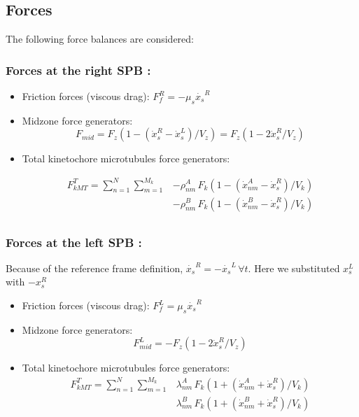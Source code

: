 \documentclass[a4paper,12pt]{article}
\begin{document}
\subsection{Forces}

The following force balances are considered:


\subsubsection{Forces at the right SPB :}


\begin{itemize}
\item Friction forces (viscous drag):  $F_f^R = -\mu_s \dot{x_s}^R$
\item Midzone force generators: 
  $$F_{mid} = F_z\left(1 - (\dot{x}^R_s - \dot{x}_s^L)/V_z\right) =
  F_z\left(1 - 2\dot{x}^R_s / V_z\right) $$
\item Total kinetochore microtubules force generators:

 $$ \begin{aligned}
    F_{kMT}^T = \sum_{n = 1}^{N}\sum_{m = 1}^{M_k} & - \rho_{nm}^A\,F_k\left( 1 -
      (\dot{x}^A_{nm} - \dot{x}^R_s)/V_k\right)\\
    & - \rho_{nm}^B\,F_k\left( 1 -
      (\dot{x}^B_{nm} - \dot{x}^R_s)/V_k\right)\\
 \end{aligned} $$
\end{itemize}


\subsubsection{Forces at the left SPB :}

Because of the reference frame definition, $\dot{x_s}^R =
-\dot{x_s}^L\,\forall t$. Here we substituted $x_s^L$ with $-x_s^R$
\begin{itemize}
\item Friction forces (viscous drag):  $F_f^L = \mu_s \dot{x_s}^R$
\item Midzone force generators: 
  $$F_{mid}^L = - F_z\left(1 - 2\dot{x}^R_s / V_z\right) $$
\item Total kinetochore microtubules force generators:
$$  \begin{aligned}
    F_{kMT}^T = \sum_{n = 1}^{N}\sum_{m = 1}^{M_k} &  \lambda_{nm}^A\,F_k\left(1 +
      (\dot{x}^A_{nm} + \dot{x}^R_s)/V_k\right)\\
    & \lambda_{nm}^B\,F_k\left(1 +
      (\dot{x}^B_{nm} + \dot{x}^R_s)/V_k\right)
  \end{aligned}
$$
\end{itemize}
\end{document}
